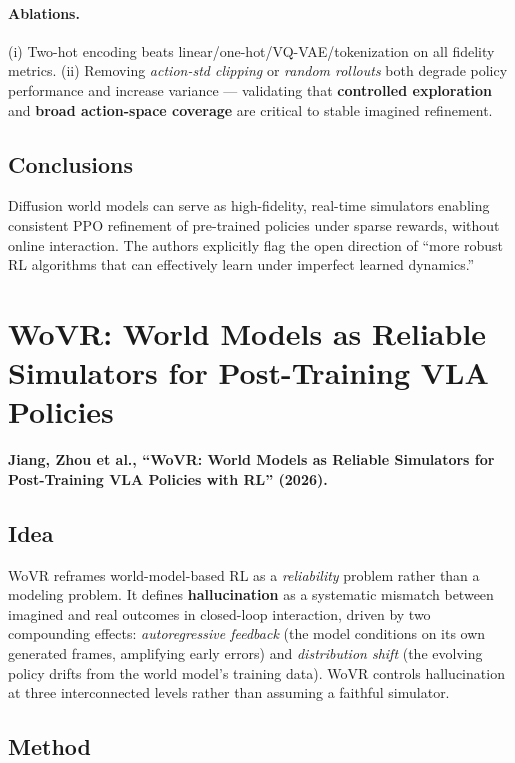 \documentclass[11pt]{article}
\begin{document}
\paragraph{Ablations.} (i) Two-hot encoding beats linear/one-hot/VQ-VAE/tokenization on all fidelity
metrics. (ii) Removing \emph{action-std clipping} or \emph{random rollouts} both degrade policy
performance and increase variance --- validating that \textbf{controlled exploration} and \textbf{broad
action-space coverage} are critical to stable imagined refinement.

\subsection{Conclusions}
Diffusion world models can serve as high-fidelity, real-time simulators enabling consistent
PPO refinement of pre-trained policies under sparse rewards, without online interaction. The authors
explicitly flag the open direction of ``more robust RL algorithms that can effectively learn under
imperfect learned dynamics.''

\section{WoVR: World Models as Reliable Simulators for Post-Training VLA Policies}
\textbf{Jiang, Zhou et al., ``WoVR: World Models as Reliable Simulators for Post-Training VLA Policies
with RL'' (2026).}

\subsection{Idea}
WoVR reframes world-model-based RL as a \emph{reliability} problem rather than a modeling problem.
It defines \textbf{hallucination} as a systematic mismatch between imagined and real outcomes in
closed-loop interaction, driven by two compounding effects: \emph{autoregressive feedback} (the model
conditions on its own generated frames, amplifying early errors) and \emph{distribution shift} (the
evolving policy drifts from the world model's training data). WoVR controls hallucination at three
interconnected levels rather than assuming a faithful simulator.

\subsection{Method}
\end{document}
